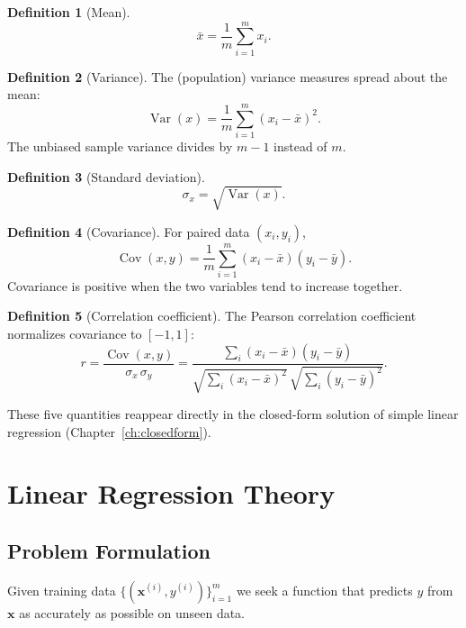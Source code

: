 \documentclass[11pt,a4paper]{report}
\theoremstyle{definition}
\newtheorem{definition}{Definition}[chapter]
\theoremstyle{plain}
\theoremstyle{remark}
\newcommand{\vx}{\mathbf{x}}
\newcommand{\xbar}{\bar{x}}
\newcommand{\ybar}{\bar{y}}
\DeclareMathOperator{\Cov}{Cov}
\DeclareMathOperator{\Var}{Var}
\begin{document}
	\begin{definition}[Mean]
		\[
		\xbar=\frac1m\sum_{i=1}^{m}x_i .
		\]
	\end{definition}
	
	\begin{definition}[Variance]
		The (population) variance measures spread about the mean:
		\[
		\Var(x)=\frac1m\sum_{i=1}^{m}(x_i-\xbar)^2 .
		\]
		The unbiased sample variance divides by $m-1$ instead of $m$.
	\end{definition}
	
	\begin{definition}[Standard deviation]
		\[
		\sigma_x=\sqrt{\Var(x)} .
		\]
	\end{definition}
	
	\begin{definition}[Covariance]
		For paired data $(x_i,y_i)$,
		\[
		\Cov(x,y)=\frac1m\sum_{i=1}^{m}(x_i-\xbar)(y_i-\ybar).
		\]
		Covariance is positive when the two variables tend to increase together.
	\end{definition}
	
	\begin{definition}[Correlation coefficient]
		The Pearson correlation coefficient normalizes covariance to $[-1,1]$:
		\begin{equation}
			r=\frac{\Cov(x,y)}{\sigma_x\,\sigma_y}
			=\frac{\sum_{i}(x_i-\xbar)(y_i-\ybar)}
			{\sqrt{\sum_{i}(x_i-\xbar)^2}\,\sqrt{\sum_{i}(y_i-\ybar)^2}}.
			\label{eq:corr}
		\end{equation}
	\end{definition}
	
	These five quantities reappear directly in the closed-form solution of simple
	linear regression (Chapter~\ref{ch:closedform}).
	
	\chapter{Linear Regression Theory}
	
	\section{Problem Formulation}
	Given training data $\{(\vx^{(i)},y^{(i)})\}_{i=1}^{m}$ we seek a function that
	predicts $y$ from $\vx$ as accurately as possible on unseen data.
	
\end{document}
